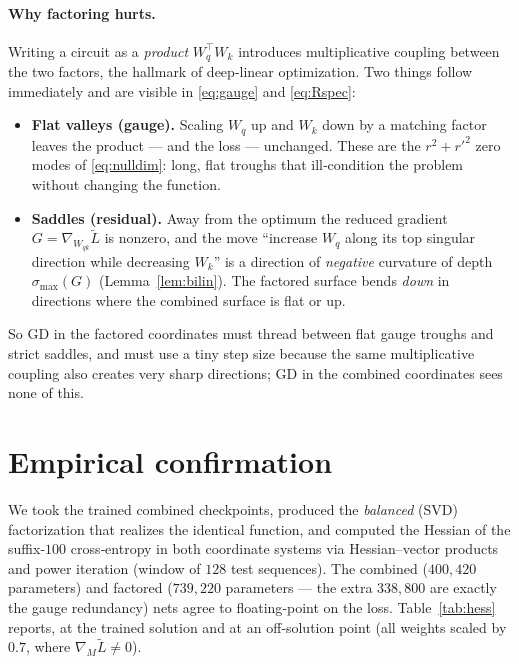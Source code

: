 \documentclass[11pt]{article}
\theoremstyle{remark}
\newcommand{\Wqk}{W_{qk}}
\newcommand{\Wq}{W_{q}}
\newcommand{\Wk}{W_{k}}
\begin{document}
\paragraph{Why factoring hurts.}
Writing a circuit as a \emph{product} $\Wq^{\!\top}\Wk$ introduces multiplicative
coupling between the two factors, the hallmark of deep‑linear optimization. Two
things follow immediately and are visible in \eqref{eq:gauge} and \eqref{eq:Rspec}:
\begin{itemize}
\item \textbf{Flat valleys (gauge).} Scaling $\Wq$ up and $\Wk$ down by a matching
factor leaves the product --- and the loss --- unchanged. These are the
$r^2{+}r'^2$ zero modes of \eqref{eq:nulldim}: long, flat troughs that
ill‑condition the problem without changing the function.
\item \textbf{Saddles (residual).} Away from the optimum the reduced gradient
$G=\nabla_{\Wqk}\widetilde L$ is nonzero, and the move ``increase $\Wq$ along its
top singular direction while decreasing $\Wk$'' is a direction of
\emph{negative} curvature of depth $\sigma_{\max}(G)$ (Lemma~\ref{lem:bilin}).
The factored surface bends \emph{down} in directions where the combined surface
is flat or up.
\end{itemize}
So GD in the factored coordinates must thread between flat gauge troughs and
strict saddles, and must use a tiny step size because the same multiplicative
coupling also creates very sharp directions; GD in the combined coordinates sees
none of this.

\section{Empirical confirmation}\label{sec:empirics}

We took the trained combined checkpoints, produced the \emph{balanced} (SVD)
factorization that realizes the identical function, and computed the Hessian of
the suffix‑$100$ cross‑entropy in both coordinate systems via Hessian--vector
products and power iteration (window of $128$ test sequences). The combined
($400{,}420$ parameters) and factored ($739{,}220$ parameters --- the extra
$338{,}800$ are exactly the gauge redundancy) nets agree to floating‑point on the
loss. Table~\ref{tab:hess} reports, at the trained solution and at an
off‑solution point (all weights scaled by $0.7$, where $\nabla_M\widetilde L\neq0$).
\end{document}
